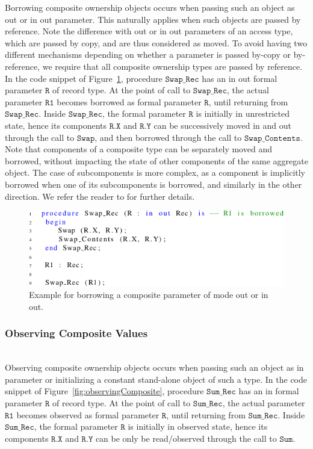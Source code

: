 \documentclass{llncs}
\newcommand\var[1]{\ensuremath{\mathtt{#1}}}
\newcommand{\keyword}[1]{\textsf{#1}}
\begin{document}
Borrowing composite ownership objects occurs when passing such an object as \keyword{out} or \keyword{in out} parameter. This naturally applies when
such objects are passed by reference. Note the difference with \keyword{out} or \keyword{in out} parameters of an access type, which are passed by copy,
and are thus considered as moved. To avoid having two different mechanisms depending on whether a parameter is passed by-copy or by-reference, we require
that all composite ownership types are passed by reference.
In the code snippet of Figure~\ref{fig:borrowingComposite}, procedure \var{Swap\_Rec} has an \keyword{in out} formal parameter \var{R} of record type. At the point of
call to \var{Swap\_Rec}, the actual parameter \var{R1} becomes borrowed as formal parameter \var{R}, until returning from \var{Swap\_Rec}. Inside \var{Swap\_Rec}, the formal parameter \var{R} is initially
in unrestricted state, hence its components \var{R.X} and \var{R.Y} can be successively moved in and out through the call to \var{Swap}, and then borrowed through the call to \var{Swap\_Contents}.
Note that components of a composite type can be separately moved and borrowed, without impacting the state of other components of the same aggregate object.
The case of subcomponents is more complex, as a component is implicitly borrowed when one of its subcomponents is borrowed, and similarly in the other direction.
We refer the reader to \cite{AI2017} for further details.

\begin{figure}[htb!]
\centering
   \includegraphics[]{borrowingComposite}
   \caption{Example for borrowing a composite parameter of mode \keyword{out} or \keyword{in out}.}
   \label{fig:borrowingComposite}
\end{figure}

   
\subsubsection{Observing Composite Values}
\label{subsubsec:extendingBorrowing}
\ \\

Observing composite ownership objects occurs when passing such an object as \keyword{in} parameter or initializing a constant stand-alone object of such a type. 
In the code snippet of Figure~\ref{fig:observingComposite}, procedure \var{Sum\_Rec} has an \keyword{in} formal parameter \var{R} of record type.
At the point of call to \var{Sum\_Rec}, the actual parameter \var{R1} becomes observed as formal parameter \var{R}, until returning from \var{Sum\_Rec}. Inside \var{Sum\_Rec},
the formal parameter \var{R} is initially in observed state, hence its components \var{R.X} and \var{R.Y} can be only be read/observed through the call to \var{Sum}.
\end{document}
